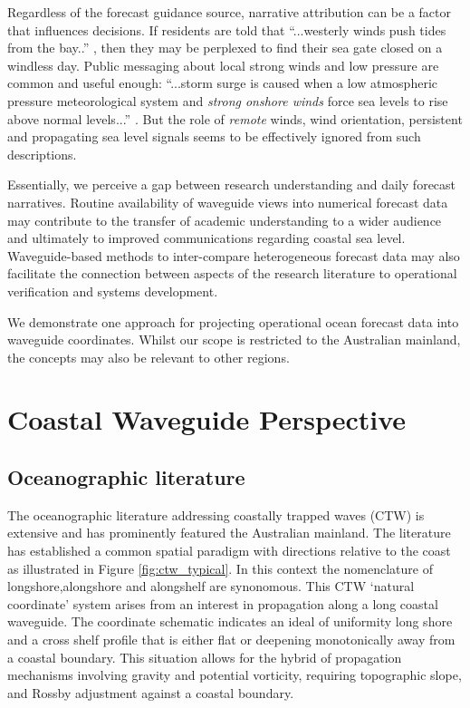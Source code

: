Regardless of the forecast guidance source, narrative attribution can be a factor that influences decisions.  
If residents are told that ``...westerly winds push tides from the bay..'' \citep{urlMW:2018}, then they may be perplexed to find their sea gate closed on a windless day.  Public messaging about local strong winds and low pressure are common and useful enough:
``...storm surge is caused when a low atmospheric pressure meteorological system and \emph{strong onshore winds} force sea levels to rise above normal levels...''
\citep{urlBris:2018}.  But the role of \emph{remote} winds, wind orientation, persistent and propagating sea level signals seems to be effectively ignored from such descriptions.  


Essentially, we perceive a gap between research understanding and daily forecast narratives.
Routine availability of waveguide views into numerical forecast data may contribute to the transfer of academic understanding to a wider audience and ultimately to improved communications regarding coastal sea level.
Waveguide-based methods to inter-compare heterogeneous forecast data may also facilitate the connection between aspects of the research literature to operational verification and systems development.

We demonstrate one approach for projecting operational ocean forecast data into waveguide coordinates.  Whilst our scope is restricted to the Australian mainland, the concepts may also be relevant to other regions.


\section{Coastal Waveguide Perspective}
\label{sec:ctw_background}

\subsection{Oceanographic literature}
The oceanographic literature addressing coastally trapped waves (CTW) is extensive and has prominently featured the Australian mainland. 
The literature has established a common spatial paradigm \citep{Brink:1991dl}  with directions relative to the coast as illustrated in Figure \ref{fig:ctw_typical}. In this context the nomenclature of longshore,alongshore and alongshelf are synonomous. This CTW `natural coordinate' system \citep{gill1982atmosphere} arises from an interest in propagation along a long coastal waveguide. The coordinate schematic indicates an ideal of uniformity long shore and a cross shelf profile that is either flat or deepening monotonically away from a coastal boundary.  
This situation allows for the hybrid of propagation mechanisms involving gravity and potential vorticity, requiring topographic slope, and Rossby adjustment against a coastal boundary.   

